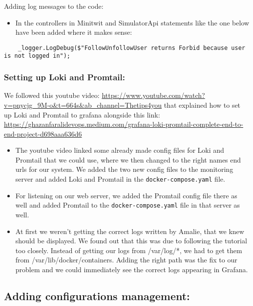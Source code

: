 Adding log messages to the code:

\begin{itemize}
    \item In the controllers in Minitwit and SimulatorApi statements like the one below have been added where it makes sense:
\end{itemize}


\begin{verbatim}
    _logger.LogDebug($"FollowUnfollowUser returns Forbid because user is not logged in");
\end{verbatim}

\subsubsection{Setting up Loki and Promtail:}
\label{log:setting-up-loki-and-promtail}

We followed this youtube video: \url{https://www.youtube.com/watch?v=pnycjg_9M-o\&t=664s\&ab_channel=Thetips4you} that explained how to set up Loki and Promtail to grafana alongside this link: \url{https://ghazanfaralidevops.medium.com/grafana-loki-promtail-complete-end-to-end-project-d698aaa636d6}

\begin{itemize}
    \item The youtube video linked some already made config files for Loki and Promtail that we could use, where we then changed to the right names end urls for our system. We added the two new config files to the monitoring server and added Loki and Promtail in the \texttt{docker-compose.yaml} file.
    \item For listening on our web server, we added the Promtail config file there as well and added Promtail to the \texttt{docker-compose.yaml} file in that server as well.
    \item At first we weren't getting the correct logs written by Amalie, that we knew should be displayed. We found out that this was due to following the tutorial too closely. Instead of getting our logs from /var/log/*, we had to get them from /var/lib/docker/containers. Adding the right path was the fix to our problem and we could immediately see the correct logs appearing in Grafana.
\end{itemize}

\subsection{Adding configurations management:}
\label{log:adding-configurations-management}

